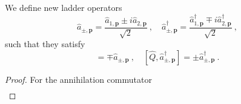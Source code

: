     We define new ladder operators
    \begin{equation*}
        \hat a_{\pm, \mathbf p} = \frac{\hat a_{1, \mathbf p} \pm i \hat a_{2, \mathbf p}}{\sqrt{2}} ~, \quad \hat a_{\pm, \mathbf p}^\dagger = \frac{\hat a_{1, \mathbf p}^\dagger \mp i \hat a_{2, \mathbf p}^\dagger}{\sqrt{2}} ~,
    \end{equation*}
    such that they satisfy 
    \begin{equation*}
        [\hat Q, \hat a_{\pm, \mathbf p}] = \mp \hat a_{\pm, \mathbf p} ~, \quad [\hat Q, \hat a_{\pm, \mathbf p}^\dagger] = \pm \hat a_{\pm, \mathbf p}^\dagger ~.
    \end{equation*}
    \begin{proof}
        For the annihilation commutator 
        \begin{equation*}
        \begin{aligned}

\end{aligned}
\end{equation*}
\end{proof}
